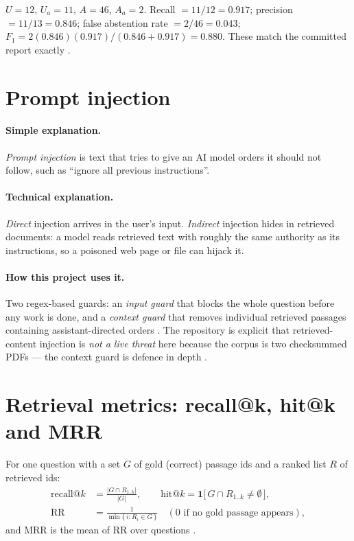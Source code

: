 \begin{example}
$U=12$, $U_a=11$, $A=46$, $A_a=2$. Recall $=11/12=0.917$; precision $=11/13=0.846$; false abstention rate $=2/46=0.043$; $F_1=2(0.846)(0.917)/(0.846+0.917)=0.880$. These match the committed report exactly .
\end{example}

\section{Prompt injection}

\paragraph{Simple explanation.} \emph{Prompt injection} is text that tries to give an AI model orders it should not follow, such as ``ignore all previous instructions''.

\paragraph{Technical explanation.} \emph{Direct} injection arrives in the user's input. \emph{Indirect} injection hides in retrieved documents: a model reads retrieved text with roughly the same authority as its instructions, so a poisoned web page or file can hijack it.

\paragraph{How this project uses it.} Two regex-based guards: an \emph{input guard} that blocks the whole question before any work is done, and a \emph{context guard} that removes individual retrieved passages containing assistant-directed orders . The repository is explicit that retrieved-content injection is \emph{not a live threat} here because the corpus is two checksummed PDFs --- the context guard is defence in depth .

\section{Retrieval metrics: recall@k, hit@k and MRR}
\label{sec:ir-metrics}

For one question with a set $G$ of gold (correct) passage ids and a ranked list $R$ of retrieved ids:
\begin{align}
\text{recall@}k &= \frac{|G \cap R_{1..k}|}{|G|}, \qquad
\text{hit@}k = \mathbf{1}\bigl[\,G \cap R_{1..k} \neq \emptyset\,\bigr], \\
\text{RR} &= \frac{1}{\min\{\,i : R_i \in G\,\}} \quad(\text{0 if no gold passage appears}),
\end{align}
and MRR is the mean of RR over questions .

